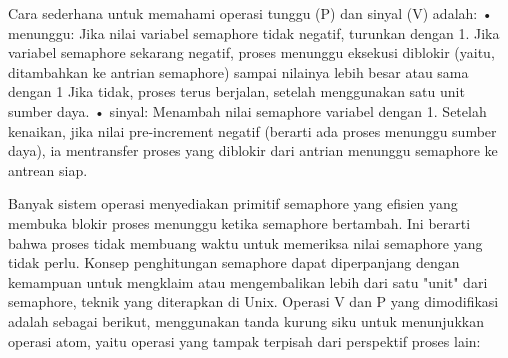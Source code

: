 Cara sederhana untuk memahami operasi tunggu (P) dan sinyal (V) adalah:
• menunggu: Jika nilai variabel semaphore tidak negatif, turunkan dengan 1. Jika variabel semaphore sekarang negatif, proses menunggu eksekusi diblokir (yaitu, ditambahkan
ke antrian semaphore) sampai nilainya lebih besar atau sama dengan 1 Jika tidak, proses terus berjalan, setelah menggunakan satu unit sumber daya.
• sinyal: Menambah nilai semaphore variabel dengan 1. Setelah kenaikan, jika nilai pre-increment negatif (berarti ada proses menunggu sumber daya), ia mentransfer 
proses yang diblokir dari antrian menunggu semaphore ke antrean siap.

Banyak sistem operasi menyediakan primitif semaphore yang efisien yang membuka blokir proses menunggu ketika semaphore bertambah. Ini berarti bahwa proses tidak membuang waktu untuk memeriksa nilai semaphore yang tidak perlu.
Konsep penghitungan semaphore dapat diperpanjang dengan kemampuan untuk mengklaim atau mengembalikan lebih dari satu "unit" dari semaphore, teknik yang diterapkan di Unix. Operasi V dan P yang dimodifikasi adalah sebagai berikut, menggunakan tanda kurung siku untuk menunjukkan operasi atom, yaitu operasi yang tampak terpisah dari perspektif proses lain: